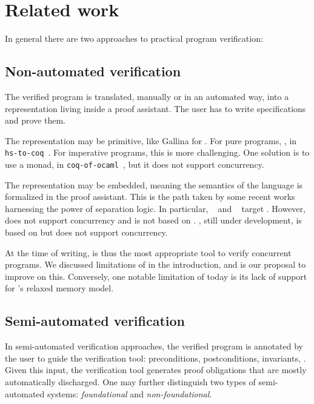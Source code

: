 \section{Related work}
\label{sec:related}

In general there are two approaches to practical program verification:

\subsection{Non-automated verification}

The verified program is translated, manually or in an automated way, into a representation living inside a proof assistant.
The user has to write specifications and prove them.

The representation may be primitive, like Gallina for \Rocq.
For pure programs, , \eg in \texttt{hs-to-coq}~\cite{DBLP:conf/cpp/Spector-Zabusky18}.
For imperative programs, this is more challenging.
One solution is to use a monad, \eg in \texttt{coq-of-ocaml}~\cite{coq-of-ocaml}, but it does not support concurrency.

The representation may be embedded, meaning the semantics of the language is formalized in the proof assistant.
This is the path taken by some recent works~\cite{DBLP:books/hal/Chargueraud23, DBLP:journals/pacmpl/GondelmanHPTB23, DBLP:conf/sosp/ChajedTKZ19,osiris} harnessing the power of separation logic.
In particular, \CFML~\cite{DBLP:books/hal/Chargueraud23} and \Osiris~\cite{osiris} target \OCaml.
However, \CFML does not support concurrency and is not based on \Iris.
\Osiris, still under development, is based on \Iris but does not support concurrency.

At the time of writing, \HeapLang is thus the most appropriate tool to verify concurrent \OCaml programs. We discussed limitations of \HeapLang in the introduction, and \ZooLang is our proposal to improve on this. Conversely, one notable limitation of \ZooLang today is its lack of support for \OCaml's relaxed memory model.

\subsection{Semi-automated verification}

In semi-automated verification approaches, the verified program is annotated by the user to guide the verification tool: preconditions, postconditions, invariants, \etc.
Given this input, the verification tool generates proof obligations that are mostly automatically discharged.
One may further distinguish two types of semi-automated systems: \emph{foundational} and \emph{non-foundational}.

